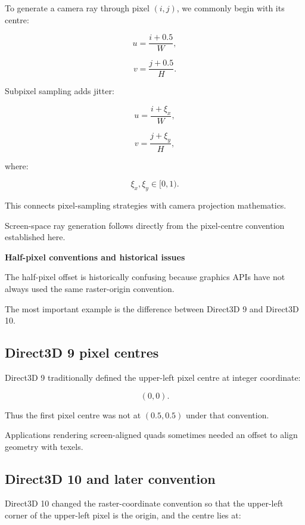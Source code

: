 To generate a camera ray through pixel \((i,j)\), we commonly begin with its centre:

\[
 u=\frac{i+0.5}{W},
\]

\[
 v=\frac{j+0.5}{H}.
\]

Subpixel sampling adds jitter:

\[
 u=\frac{i+\xi_x}{W},
\]

\[
 v=\frac{j+\xi_y}{H},
\]

where:

\[
 \xi_x,\xi_y\in[0,1).
\]

This connects pixel-sampling strategies with camera projection mathematics.

Screen-space ray generation follows directly from the pixel-centre convention established here.

\textbf{Half-pixel conventions and historical issues}

The half-pixel offset is historically confusing because graphics APIs have not always used the same raster-origin convention.

The most important example is the difference between Direct3D 9 and Direct3D 10.

\subsection{Direct3D 9 pixel centres}\label{02-foundations-ii-ch033-direct3d-9-pixel-centres}

\hypertarget{02-foundations-ii-ch033-direct3d-9-pixel-centres}{}

Direct3D 9 traditionally defined the upper-left pixel centre at integer coordinate:

\[
 \boxed{(0,0)}.
\]

Thus the first pixel centre was not at \((0.5,0.5)\) under that convention.

Applications rendering screen-aligned quads sometimes needed an offset to align geometry with texels.

\subsection{Direct3D 10 and later convention}\label{02-foundations-ii-ch033-direct3d-10-and-later-convention}

\hypertarget{02-foundations-ii-ch033-direct3d-10-and-later-convention}{}

Direct3D 10 changed the raster-coordinate convention so that the upper-left corner of the upper-left pixel is the origin, and the centre lies at:

